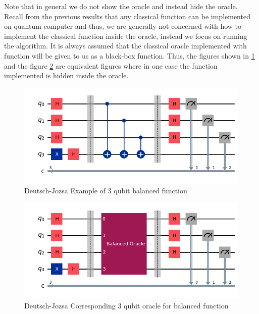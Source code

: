 \documentclass[12pt, oneside]{book}
\theoremstyle{definition}
\theoremstyle{definition}
\theoremstyle{remark}
\begin{document}
\begin{enumerate}
    Note that in general we do not show the oracle and instead hide the oracle. Recall from the previous results that any classical function can be implemented on quantum computer and thus, we are generally not concerned with how to implement the classical function inside the oracle, instead we focus on running the algorithm. It is always assumed that the classical oracle implemented with function will be given to us as a black-box function. Thus, the figures shown in \ref{fig:deutsch_3q_example} and the figure \ref{fig:deutsch_3q_oracle} are equivalent figures where in one case the function implemented is hidden inside the oracle.
\begin{figure}
    \centering
    \includegraphics[width=0.5\linewidth]{../images/deutsch_3q_example.png}
    \caption{Deutsch-Jozsa Example of 3 qubit balanced function}
    \label{fig:deutsch_3q_example}
\end{figure}
\begin{figure}[H]
    \centering
    \includegraphics[width=0.5\linewidth]{../images/deutsch_3q_oracle.png}
    \caption{Deutsch-Jozsa Corresponding 3 qubit oracle for balanced function}
    \label{fig:deutsch_3q_oracle}
\end{figure}
\end{enumerate}
\end{document}
